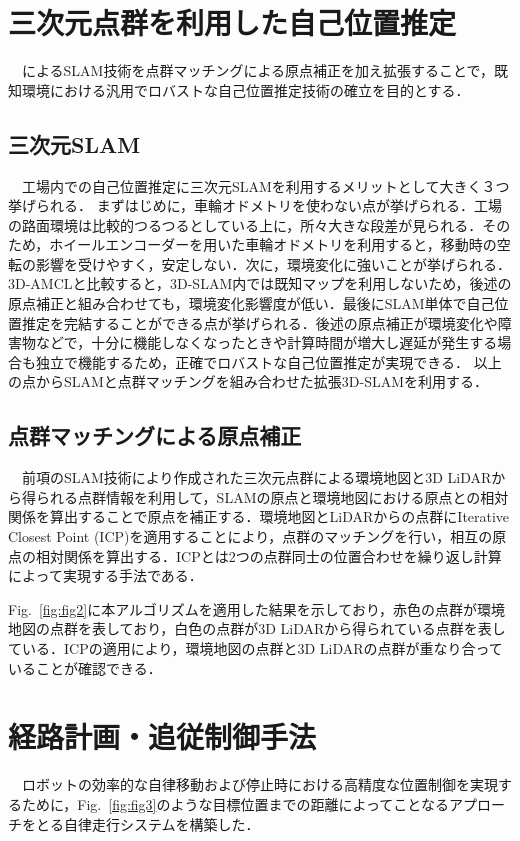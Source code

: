 \section{三次元点群を利用した自己位置推定}\label{sec:self_position}
　\cite{6DSLAM_outside, 3D_SLAM_outside, EKF_SLAM, FAST-LIO, FAST-LIO2}によるSLAM技術を点群マッチングによる原点補正を加え拡張することで，既知環境における汎用でロバストな自己位置推定技術の確立を目的とする．

\subsection{三次元SLAM}
　工場内での自己位置推定に三次元SLAMを利用するメリットとして大きく３つ挙げられる．
まずはじめに，車輪オドメトリを使わない点が挙げられる．工場の路面環境は比較的つるつるとしている上に，所々大きな段差が見られる．そのため，ホイールエンコーダーを用いた車輪オドメトリを利用すると，移動時の空転の影響を受けやすく，安定しない．次に，環境変化に強いことが挙げられる．3D-AMCL\cite{3d-AMCL}と比較すると，3D-SLAM内では既知マップを利用しないため，後述の原点補正と組み合わせても，環境変化影響度が低い．最後にSLAM単体で自己位置推定を完結することができる点が挙げられる．後述の原点補正が環境変化や障害物などで，十分に機能しなくなったときや計算時間が増大し遅延が発生する場合も独立で機能するため，正確でロバストな自己位置推定が実現できる．
以上の点からSLAMと点群マッチングを組み合わせた拡張3D-SLAMを利用する．

\subsection{点群マッチングによる原点補正}
　前項のSLAM技術により作成された三次元点群による環境地図と3D LiDARから得られる点群情報を利用して，SLAMの原点と環境地図における原点との相対関係を算出することで原点を補正する．環境地図とLiDARからの点群にIterative Closest Point (ICP)\cite{ICP}を適用することにより，点群のマッチングを行い，相互の原点の相対関係を算出する．ICPとは2つの点群同士の位置合わせを繰り返し計算によって実現する手法である．

Fig.~\ref{fig:fig2}に本アルゴリズムを適用した結果を示しており，赤色の点群が環境地図の点群を表しており，白色の点群が3D LiDARから得られている点群を表している．ICPの適用により，環境地図の点群と3D LiDARの点群が重なり合っていることが確認できる．

\section{経路計画・追従制御手法}\label{sec:control}
　ロボットの効率的な自律移動および停止時における高精度な位置制御を実現するために，Fig.~\ref{fig:fig3}のような目標位置までの距離によってことなるアプローチをとる自律走行システムを構築した．

